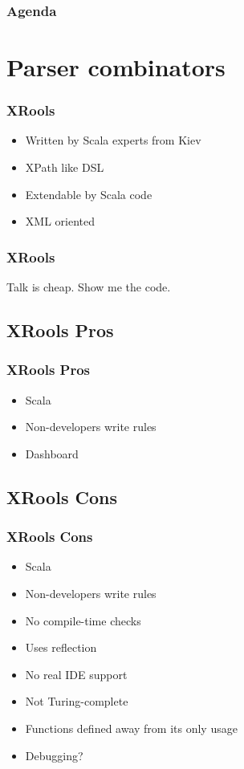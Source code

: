 \documentclass[14pt]{beamer}
\begin{document}
\frame%
{\frametitle{Agenda}
  \tableofcontents[1]
}

\section{Parser combinators}
\frame
{\frametitle{XRools}
\begin{itemize}
  \item Written by Scala experts from Kiev
  \item XPath like DSL
  \item Extendable by Scala code
  \item XML oriented
\end{itemize}
}
\frame
{\frametitle{XRools}
\begin{center}
  \large Talk is cheap. Show me the code.
\end{center}
}
\subsection{XRools Pros}
\frame
{\frametitle{XRools Pros}
\begin{itemize}
    \item<1-> Scala
    \item<2-> Non-developers write rules
    \item<3-> Dashboard 
\end{itemize}
}
\subsection{XRools Cons}
\frame
{\frametitle{XRools Cons}
\begin{itemize}
    \item<1-> Scala
    \item<2-> Non-developers write rules
    \item<3-> No compile-time checks
    \item<4-> Uses reflection
    \item<5-> No real IDE support
    \item<6-> Not Turing-complete
    \item<7-> Functions defined away from its only usage
    \item<8-> Debugging?
\end{itemize}
}
\end{document}
